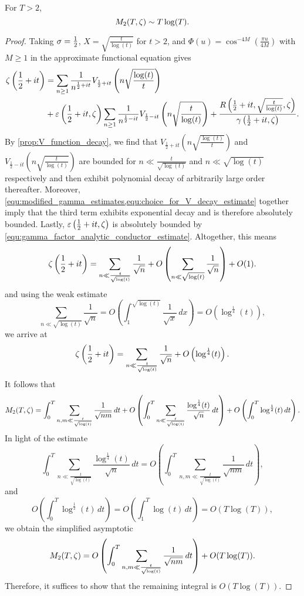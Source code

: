     \begin{theorem}
      For $T > 2$,
      \[
        M_{2}(T,\zeta) \sim T\log(T).
      \]
    \end{theorem}
    \begin{proof}
      Taking $\sigma = \frac{1}{2}$, $X = \sqrt{\frac{t}{\log(t)}}$ for $t > 2$, and $\Phi(u) = \cos^{-4M}\left(\frac{\pi u}{4M}\right)$ with $M \ge 1$ in the approximate functional equation gives
      \begin{align*}
        \zeta\left(\frac{1}{2}+it\right) &= \sum_{n \ge 1}\frac{1}{n^{\frac{1}{2}+it}}V_{\frac{1}{2}+it}\left(n\sqrt{\frac{\log(t)}{t}}\right) \\
        &+ \varepsilon\left(\frac{1}{2}+it,\zeta\right)\sum_{n \ge 1}\frac{1}{n^{\frac{1}{2}-it}}V_{\frac{1}{2}-it}\left(n\sqrt{\frac{t}{\log(t)}}\right)+\frac{R\left(\frac{1}{2}+it,\sqrt{\frac{t}{\log(t)}},\zeta\right)}{\gamma\left(\frac{1}{2}+it,\zeta\right)}.
      \end{align*}
      By \cref{prop:V_function_decay}, we find that $V_{\frac{1}{2}+it}\left(n\sqrt{\frac{\log(t)}{t}}\right)$ and $V_{\frac{1}{2}-it}\left(n\sqrt{\frac{t}{\log(t)}}\right)$ are bounded for $n \ll \frac{t}{\sqrt{\log(t)}}$ and $n \ll \sqrt{\log(t)}$ respectively and then exhibit polynomial decay of arbitrarily large order thereafter. Moreover, \cref{equ:modified_gamma_estimates,equ:choice_for_V_decay_estimate} together imply that the third term exhibits exponential decay and is therefore absolutely bounded. Lastly, $\varepsilon\left(\frac{1}{2}+it,\zeta\right)$ is absolutely bounded by \cref{equ:gamma_factor_analytic_conductor_estimate}. Altogether, this means
      \[
        \zeta\left(\frac{1}{2}+it\right) = \sum_{n \ll \frac{t}{\sqrt{\log(t)}}}\frac{1}{\sqrt{n}}+O\left(\sum_{n \ll \sqrt{\log(t)}}\frac{1}{\sqrt{n}}\right)+O(1).
      \]
      and using the weak estimate
      \[
        \sum_{n \ll \sqrt{\log(t)}}\frac{1}{\sqrt{n}} = O\left(\int_{1}^{\sqrt{\log(t)}}\frac{1}{\sqrt{x}}\,dx\right) = O\left(\log^{\frac{1}{4}}(t)\right),
      \]
      we arrive at
      \[
        \zeta\left(\frac{1}{2}+it\right) = \sum_{n \ll \frac{t}{\sqrt{\log(t)}}}\frac{1}{\sqrt{n}}+O\left(\log^{\frac{1}{4}}(t)\right).
      \]
      It follows that
      \[
        M_{2}(T,\zeta) = \int_{0}^{T}\sum_{n,m \ll \frac{t}{\sqrt{\log(t)}}}\frac{1}{\sqrt{nm}}\,dt+O\left(\int_{0}^{T}\sum_{n \ll \frac{t}{\sqrt{\log(t)}}}\frac{\log^{\frac{1}{4}}(t)}{\sqrt{n}}\,dt\right)+O\left(\int_{0}^{T}\log^{\frac{1}{2}}(t)\,dt\right).
      \]
      In light of the estimate
      \[
        \int_{0}^{T}\sum_{n \ll \frac{t}{\sqrt{\log(t)}}}\frac{\log^{\frac{1}{4}}(t)}{\sqrt{n}}\,dt = O\left(\int_{0}^{T}\sum_{n,m \ll \frac{t}{\sqrt{\log(t)}}}\frac{1}{\sqrt{nm}}\,dt\right),
      \]
      and
      \[
        O\left(\int_{0}^{T}\log^{\frac{1}{2}}(t)\,dt\right) = O\left(\int_{1}^{T}\log(t)\,dt\right) = O(T\log(T)),
      \]
      we obtain the simplified asymptotic
      \[
        M_{2}(T,\zeta) = O\left(\int_{0}^{T}\sum_{n,m \ll \frac{t}{\sqrt{\log(t)}}}\frac{1}{\sqrt{nm}}\,dt\right)+O(T\log(T)).
      \]
      Therefore, it suffices to show that the remaining integral is $O(T\log(T))$. 
    \end{proof}